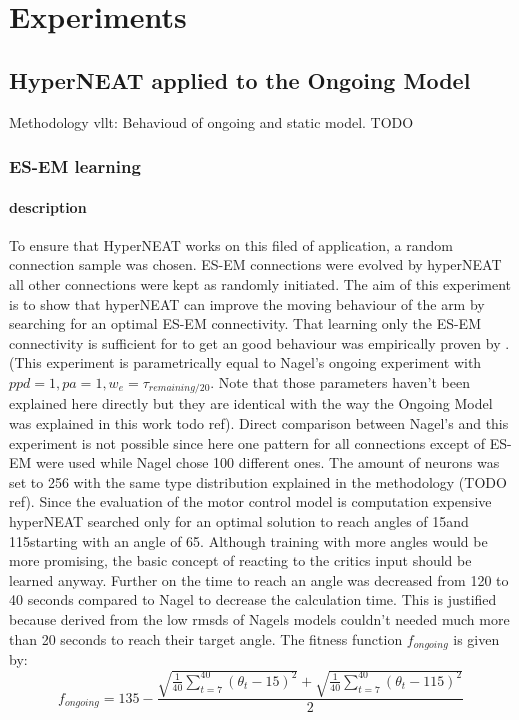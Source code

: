 \chapter{Experiments}\label{experiments}
\section{HyperNEAT applied to the Ongoing Model}
Methodology vllt: Behavioud of ongoing and static model. TODO

\subsection{ES-EM learning}
\subsubsection{description}
To ensure that HyperNEAT works on this filed of application, a random connection sample was chosen. ES-EM connections were evolved by hyperNEAT all other connections were kept as randomly initiated. The aim of this experiment is to show that hyperNEAT can improve the moving behaviour of the arm by searching for an optimal ES-EM connectivity. That learning only the ES-EM connectivity is sufficient for to get an good behaviour was empirically proven by \cite{sebastianPaper}. (This experiment is parametrically equal to Nagel's ongoing experiment with $ppd =1, pa=1, w_e =\tau_{remaining/20}$. Note that those parameters haven't been explained here directly but they are identical with the way the Ongoing Model was explained in this work todo ref). Direct comparison between Nagel's and this experiment is not possible since here one pattern for all connections except of ES-EM were used while Nagel chose 100 different ones. 
The amount of neurons was set to 256 with the same type distribution explained in the methodology (TODO ref). Since the evaluation of the motor control model is computation expensive hyperNEAT searched only for an optimal solution to reach angles of 15\degree and 115\degree starting with an angle of 65\degree. Although training with more angles would be more promising, the basic concept of reacting to the critics input should be learned anyway. Further on the time to reach an angle was decreased from 120 to 40 seconds compared to Nagel to decrease the calculation time. This is justified because derived from the low rmsds of Nagels models couldn't needed much more than 20 seconds to reach their target angle. The fitness function $f_{ongoing}$ is given by:
\begin{equation}
	f_{ongoing}= 135-\dfrac{\sqrt{\frac{1}{40}\displaystyle\sum_{t=7}^{40} (\theta_t-15)^2}+\sqrt{\frac{1}{40}\displaystyle\sum_{t=7}^{40} (\theta_t-115)^2}}{2}
\end{equation} 
